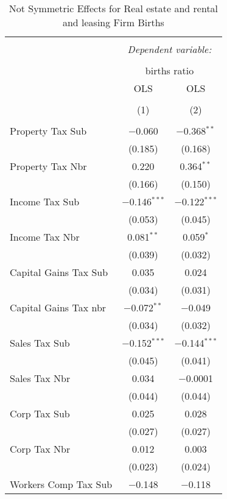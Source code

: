 
\begin{table}[!htbp] \centering 
  \caption{Not Symmetric Effects for  Real estate and rental and leasing Firm Births} 
  \label{53noequality} 
\footnotesize 
\begin{tabular}{@{\extracolsep{5pt}}lcc} 
\\[-1.8ex]\hline 
\hline \\[-1.8ex] 
 & \multicolumn{2}{c}{\textit{Dependent variable:}} \\ 
\cline{2-3} 
\\[-1.8ex] & \multicolumn{2}{c}{births ratio} \\ 
 & OLS & OLS \\ 
\\[-1.8ex] & (1) & (2)\\ 
\hline \\[-1.8ex] 
 Property Tax Sub & $-$0.060 & $-$0.368$^{**}$ \\ 
  & (0.185) & (0.168) \\ 
  Property Tax Nbr & 0.220 & 0.364$^{**}$ \\ 
  & (0.166) & (0.150) \\ 
  Income Tax Sub & $-$0.146$^{***}$ & $-$0.122$^{***}$ \\ 
  & (0.053) & (0.045) \\ 
  Income Tax Nbr & 0.081$^{**}$ & 0.059$^{*}$ \\ 
  & (0.039) & (0.032) \\ 
  Capital Gains Tax Sub & 0.035 & 0.024 \\ 
  & (0.034) & (0.031) \\ 
  Capital Gains Tax nbr & $-$0.072$^{**}$ & $-$0.049 \\ 
  & (0.034) & (0.032) \\ 
  Sales Tax Sub & $-$0.152$^{***}$ & $-$0.144$^{***}$ \\ 
  & (0.045) & (0.041) \\ 
  Sales Tax Nbr & 0.034 & $-$0.0001 \\ 
  & (0.044) & (0.044) \\ 
  Corp Tax Sub & 0.025 & 0.028 \\ 
  & (0.027) & (0.027) \\ 
  Corp Tax Nbr & 0.012 & 0.003 \\ 
  & (0.023) & (0.024) \\ 
  Workers Comp Tax Sub & $-$0.148 & $-$0.118 \\ 

\end{tabular}
\end{table}
